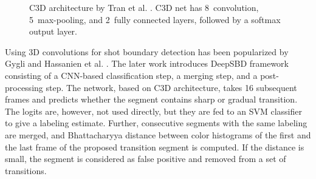 \begin{figure}[t]
    \caption[C3D architecture]{C3D architecture by Tran et al. \cite{Tran_2015_C3D}. C3D net has 8~convolution, 5~max-pooling, and 2~fully connected layers, followed by a softmax output layer.}
    \label{fig:c3d_network}
\end{figure}



Using 3D convolutions for shot boundary detection has been popularized by Gygli \cite{Gygli18} and Hassanien et al. \cite{Hassanien17}. The later work introduces DeepSBD framework consisting of a CNN-based classification step, a merging step, and a post-processing step. The network, based on C3D architecture, takes 16 subsequent frames and predicts whether the segment contains sharp or gradual transition. The logits are, however, not used directly, but they are fed to an SVM classifier to give a labeling estimate. Further, consecutive segments with the same labeling are merged, and Bhattacharyya distance between color histograms of the first and the last frame of the proposed transition segment is computed. If the distance is small, the segment is considered as false positive and removed from a set of transitions.

